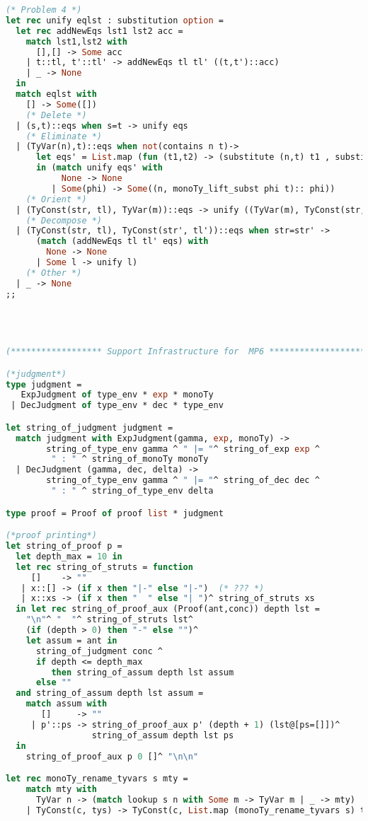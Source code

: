 \begin{lstlisting}[language=Caml, caption=definitions.ml]
(* Problem 4 *)
let rec unify eqlst : substitution option =
  let rec addNewEqs lst1 lst2 acc =
    match lst1,lst2 with
      [],[] -> Some acc
    | t::tl, t'::tl' -> addNewEqs tl tl' ((t,t')::acc)
    | _ -> None
  in
  match eqlst with
    [] -> Some([])
    (* Delete *)
  | (s,t)::eqs when s=t -> unify eqs
    (* Eliminate *)
  | (TyVar(n),t)::eqs when not(contains n t)-> 
      let eqs' = List.map (fun (t1,t2) -> (substitute (n,t) t1 , substitute (n,t) t2)) eqs
      in (match unify eqs' with
           None -> None
         | Some(phi) -> Some((n, monoTy_lift_subst phi t):: phi))
    (* Orient *)
  | (TyConst(str, tl), TyVar(m))::eqs -> unify ((TyVar(m), TyConst(str, tl))::eqs)
    (* Decompose *)
  | (TyConst(str, tl), TyConst(str', tl'))::eqs when str=str' -> 
      (match (addNewEqs tl tl' eqs) with
        None -> None
      | Some l -> unify l)
    (* Other *)
  | _ -> None
;;




(****************** Support Infrastructure for  MP6 ***********************)

(*judgment*) 
type judgment =
   ExpJudgment of type_env * exp * monoTy
 | DecJudgment of type_env * dec * type_env

let string_of_judgment judgment =
  match judgment with ExpJudgment(gamma, exp, monoTy) ->
        string_of_type_env gamma ^ " |= "^ string_of_exp exp ^
         " : " ^ string_of_monoTy monoTy
  | DecJudgment (gamma, dec, delta) ->
        string_of_type_env gamma ^ " |= "^ string_of_dec dec ^
         " : " ^ string_of_type_env delta

type proof = Proof of proof list * judgment

(*proof printing*)
let string_of_proof p =
  let depth_max = 10 in
  let rec string_of_struts = function
     []    -> ""
   | x::[] -> (if x then "|-" else "|-")  (* ??? *)
   | x::xs -> (if x then "  " else "| ")^ string_of_struts xs
  in let rec string_of_proof_aux (Proof(ant,conc)) depth lst =
    "\n"^ "  "^ string_of_struts lst^
    (if (depth > 0) then "-" else "")^
    let assum = ant in
      string_of_judgment conc ^
      if depth <= depth_max
         then string_of_assum depth lst assum
      else ""
  and string_of_assum depth lst assum =
    match assum with 
       []     -> ""
     | p'::ps -> string_of_proof_aux p' (depth + 1) (lst@[ps=[]])^
                 string_of_assum depth lst ps
  in
    string_of_proof_aux p 0 []^ "\n\n"

let rec monoTy_rename_tyvars s mty =
    match mty with
      TyVar n -> (match lookup s n with Some m -> TyVar m | _ -> mty)
    | TyConst(c, tys) -> TyConst(c, List.map (monoTy_rename_tyvars s) tys)


\end{lstlisting}
